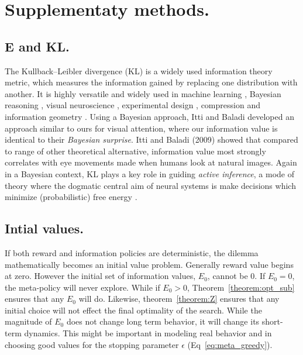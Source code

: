 \documentclass[9pt,twocolumn,twoside]{pnas-new}
\begin{document}
\clearpage
\newpage
\section*{Supplementaty methods.}

\subsection*{E and KL.}
The Kullback--Leibler divergence (KL) is a widely used information theory metric, which measures the information gained by replacing one distribution with another. It is highly versatile and widely used in machine learning \cite{Goodfellow-et-al-2016}, Bayesian reasoning \cite{Itti2009,Friston2016}, visual neuroscience \cite{Itti2009}, experimental design \cite{Lopez-Fidalgo2007}, compression \cite{Mackay,Still2012} and information geometry \cite{Ay2015}. Using a Bayesian approach, Itti and Baladi \citep{Itti2009} developed an approach similar to ours for visual attention, where our information value is identical to their \textit{Bayesian surprise}. Itti and Baladi (2009) showed that compared to range of other theoretical alternative, information value most strongly correlates with eye movements made when humans look at natural images. Again in a Bayesian context, KL plays a key role in guiding \textit{active inference}, a mode of theory where the dogmatic central aim of neural systems is make decisions which minimize (probabilistic) free energy \cite{Friston2016,Schwartenbeck2019}. 

\subsection*{Intial values.} If both reward and information policies are deterministic, the dilemma mathematically becomes an initial value problem. Generally reward value begins at zero. However the initial set of information values, $E_0$, cannot be 0. If $E_0 = 0$, the meta-policy will never explore. While if $E_0 > 0$, Theorem~\ref{theorem:opt_sub} ensures that any $E_0$ will do. Likewise, theorem~\ref{theorem:Z} ensures that any initial choice will not effect the final optimality of the search. While the magnitude of $E_0$ does not change long term behavior, it will change its short-term dynamics. This might be important in modeling real behavior and in choosing good values for the stopping parameter $\epsilon$ (Eq~\ref{eq:meta_greedy}). 
\end{document}

